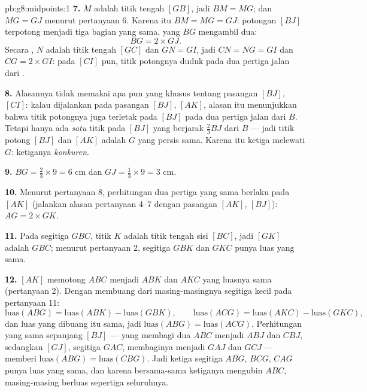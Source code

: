 \begin{solution}{pb:g8:midpoints:1}
\textbf{7.} $M$ adalah titik tengah $[GB]$, jadi $BM = MG$; dan
$MG = GJ$ menurut pertanyaan 6. Karena itu $BM = MG = GJ$: potongan
 $[BJ]$ terpotong menjadi tiga bagian yang sama, yang $BG$ mengambil dua:
\[
BG = 2 \times GJ .
\]
Secara , $N$ adalah titik tengah $[GC]$ dan $GN = GI$, jadi
$CN = NG = GI$ dan $CG = 2 \times GI$: pada  $[CI]$ pun,
titik potongnya duduk pada dua pertiga jalan dari .

\textbf{8.} Alasannya tidak memakai apa pun yang khusus tentang
pasangan $[BJ]$, $[CI]$: kalau dijalankan pada pasangan $[BJ]$,
$[AK]$, alasan itu menunjukkan bahwa titik potongnya juga terletak
pada $[BJ]$ pada dua pertiga jalan dari
$B$. Tetapi hanya ada \emph{satu} titik pada  $[BJ]$ yang
berjarak $\frac23 BJ$ dari $B$ --- jadi titik potong
$[BJ]$ dan $[AK]$ adalah $G$ yang persis sama. Karena itu ketiga
 melewati $G$: ketiganya \emph{konkuren}.

\textbf{9.} $BG = \frac23 \times 9 = 6$ cm dan
$GJ = \frac13 \times 9 = 3$ cm.

\textbf{10.} Menurut pertanyaan 8, perhitungan dua pertiga yang sama
berlaku pada  $[AK]$ (jalankan alasan pertanyaan 4--7
dengan pasangan $[AK]$, $[BJ]$): $AG = 2 \times GK$.

\textbf{11.} Pada segitiga $GBC$, titik $K$ adalah titik tengah
sisi $[BC]$, jadi $[GK]$ adalah  $GBC$; menurut pertanyaan
2, segitiga $GBK$ dan $GKC$ punya luas yang sama.

\textbf{12.}  $[AK]$ memotong $ABC$ menjadi $ABK$ dan
$AKC$ yang luasnya sama (pertanyaan 2). Dengan membuang dari
masing-masingnya segitiga kecil pada pertanyaan 11:
\[
\text{luas}(ABG) = \text{luas}(ABK) - \text{luas}(GBK),
\qquad
\text{luas}(ACG) = \text{luas}(AKC) - \text{luas}(GKC),
\]
dan luas yang dibuang itu sama, jadi
$\text{luas}(ABG) = \text{luas}(ACG)$. Perhitungan yang sama
sepanjang  $[BJ]$ --- yang membagi dua $ABC$ menjadi $ABJ$
dan $CBJ$, sedangkan $[GJ]$,  segitiga $GAC$, membaginya
menjadi $GAJ$ dan $GCJ$ --- memberi
$\text{luas}(ABG) = \text{luas}(CBG)$. Jadi ketiga segitiga
$ABG$, $BCG$, $CAG$ punya luas yang sama, dan karena bersama-sama
ketiganya mengubin $ABC$, masing-masing berluas sepertiga seluruhnya.


\end{solution}
